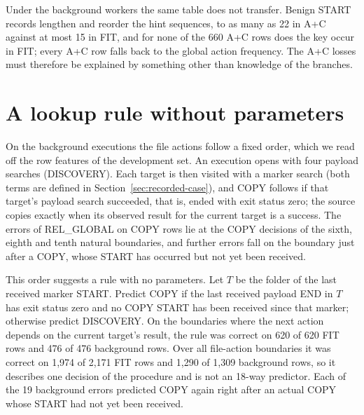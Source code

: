 Under the background workers the same table does not transfer. Benign START
records lengthen and reorder the hint sequences, to as many as 22 in
A+C against at most 15 in FIT, and for none of the 660 A+C rows does
the key occur in FIT; every A+C row falls back to the global action
frequency. The A+C losses must therefore be explained by something
other than knowledge of the branches.

\section{A lookup rule without parameters}
\label{sec:diag-rule}

On the background executions the file actions follow a fixed order,
which we read off the row features of the development set. An
execution opens with four
payload searches (DISCOVERY). Each target is then visited with a
marker search (both terms are defined in Section~\ref{sec:recorded-case}), and COPY
follows if that target's payload search succeeded, that is, ended with
exit status zero; the source copies exactly when its observed result
for the current target is a success. The errors of REL\_GLOBAL on
COPY rows lie at the COPY decisions of the sixth, eighth and tenth
natural boundaries, and further errors fall on the boundary just after
a COPY, whose START has occurred but not yet been received.

This order suggests a rule with no
parameters. Let $T$ be the folder of the last received marker START.
Predict COPY if the last received payload END in $T$ has exit status
zero and no COPY START has been received since that marker; otherwise
predict DISCOVERY. On the boundaries where the next action depends on
the current target's result, the rule was correct on 620 of 620 FIT rows
and 476 of 476 background rows. Over all file-action boundaries it was
correct on 1,974 of 2,171 FIT rows and 1,290 of 1,309 background rows,
so it describes one decision of the procedure and is not an 18-way
predictor. Each of the 19 background errors predicted COPY again right
after an actual COPY whose START had not yet been received.

